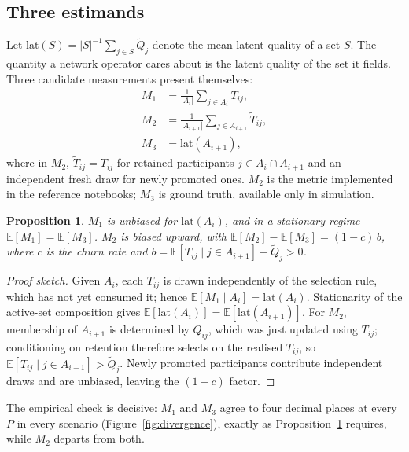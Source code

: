 \documentclass[10pt,twocolumn]{article}
\newtheorem{proposition}{Proposition}
\begin{document}
\subsection{Three estimands}
Let $\mathrm{lat}(S)=|S|^{-1}\sum_{j\in S}\tilde Q_j$ denote the mean latent quality of
a set $S$. The quantity a network operator cares about is the latent quality of the set
it fields. Three candidate measurements present themselves:
\begin{align}
M_1 &= \textstyle\frac{1}{|A_i|}\sum_{j\in A_i} T_{ij}, \\
M_2 &= \textstyle\frac{1}{|A_{i+1}|}\sum_{j\in A_{i+1}} \tilde T_{ij}, \\
M_3 &= \mathrm{lat}(A_{i+1}),
\end{align}
where in $M_2$, $\tilde T_{ij}=T_{ij}$ for retained participants
$j\in A_i\cap A_{i+1}$ and an independent fresh draw for newly promoted ones.
$M_2$ is the metric implemented in the reference notebooks; $M_3$ is ground truth,
available only in simulation.

\begin{proposition}\label{prop:bias}
$M_1$ is unbiased for $\mathrm{lat}(A_i)$, and in a stationary regime
$\mathbb{E}[M_1]=\mathbb{E}[M_3]$. $M_2$ is biased upward, with
$\mathbb{E}[M_2]-\mathbb{E}[M_3]=(1-c)\,b$, where $c$ is the churn rate and
$b=\mathbb{E}[T_{ij}\mid j\in A_{i+1}]-\tilde Q_j>0$.
\end{proposition}

\begin{proof}[Proof sketch]
Given $A_i$, each $T_{ij}$ is drawn independently of the selection rule, which has not
yet consumed it; hence $\mathbb{E}[M_1\mid A_i]=\mathrm{lat}(A_i)$. Stationarity of the
active-set composition gives $\mathbb{E}[\mathrm{lat}(A_i)]=\mathbb{E}[\mathrm{lat}(A_{i+1})]$.
For $M_2$, membership of $A_{i+1}$ is determined by $Q_{ij}$, which was just updated
using $T_{ij}$; conditioning on retention therefore selects on the realised
$T_{ij}$, so $\mathbb{E}[T_{ij}\mid j\in A_{i+1}]>\tilde Q_j$. Newly promoted
participants contribute independent draws and are unbiased, leaving the $(1-c)$ factor.
\end{proof}

The empirical check is decisive: $M_1$ and $M_3$ agree to four decimal places at every
$P$ in every scenario (Figure~\ref{fig:divergence}), exactly as
Proposition~\ref{prop:bias} requires, while $M_2$ departs from both.
\end{document}
